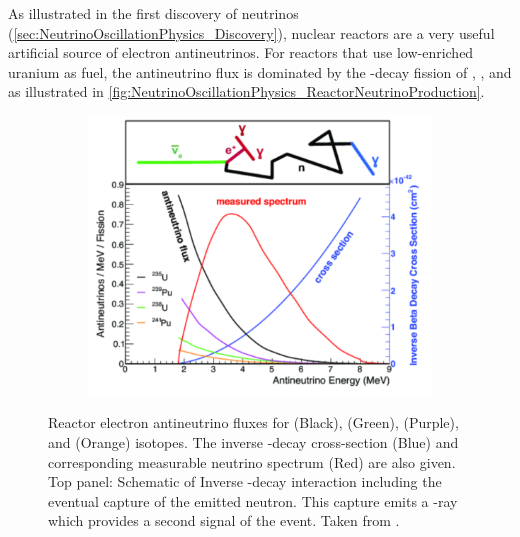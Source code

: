 As illustrated in the first discovery of neutrinos (\autoref{sec:NeutrinoOscillationPhysics_Discovery}), nuclear reactors are a very useful artificial source of electron antineutrinos. For reactors that use low-enriched uranium  as fuel, the antineutrino flux is dominated by the \quickmath{\beta}-decay fission of , ,  and  \cite{Kim2013-ye} as illustrated in \autoref{fig:NeutrinoOscillationPhysics_ReactorNeutrinoProduction}.

\begin{figure}[h]
  \begin{subfigure}[t]{0.90\textwidth}
    \includegraphics[width=\textwidth, trim={0mm 0mm 0mm 0mm}, clip,page=1]{Figures/Theory/ReactorNeutrinoProduction.pdf}
  \end{subfigure}
  \caption{Reactor electron antineutrino fluxes for  (Black),  (Green),  (Purple), and  (Orange) isotopes. The inverse \quickmath{\beta}-decay cross-section (Blue) and corresponding measurable neutrino spectrum (Red) are also given. Top panel: Schematic of Inverse \quickmath{\beta}-decay interaction including the eventual capture of the emitted neutron. This capture emits a \quickmath{\gamma}-ray which provides a second signal of the event. Taken from \cite{SajjadAthar:2021prg}.}
  \label{fig:NeutrinoOscillationPhysics_ReactorNeutrinoProduction}
\end{figure}

